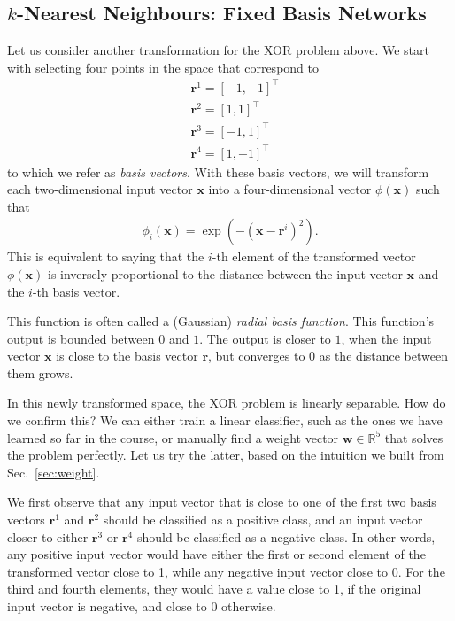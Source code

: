 \documentclass{report}
\newcommand{\vect}[1]{\mathbf{#1}}
\newcommand{\vx}[0]{\vect{x}}
\newcommand{\vw}[0]{\vect{w}}
\newcommand{\vr}[0]{\vect{r}}
\newcommand{\RR}[0]{\mathbb{R}}
\begin{document}
\subsection{$k$-Nearest Neighbours: Fixed Basis Networks}

Let us consider another transformation for the XOR problem above. We start with
selecting four points in the space that correspond to 
\begin{align*}
    &\vr^1 = [-1, -1]^\top \\
    &\vr^2 = [1, 1]^\top \\
    &\vr^3 = [-1, 1]^\top \\
    &\vr^4 = [1, -1]^\top 
\end{align*}
to which we refer as {\it basis vectors}. With these basis vectors, we will
transform each two-dimensional input vector $\vx$ into a four-dimensional vector
$\phi(\vx)$ such that
\begin{align}
    \label{eq:rbf}
    \phi_i(\vx) = \exp\left( -(\vx - \vr^i)^2 \right).
\end{align}
This is equivalent to saying that the $i$-th element of the transformed vector
$\phi(\vx)$ is inversely proportional to the distance between the input vector
$\vx$ and the $i$-th basis vector. 

This function is often called a (Gaussian) {\it radial basis function}. This
function's output is bounded between $0$ and $1$. The output is closer to $1$,
when the input vector $\vx$ is close to the basis vector $\vr$, but converges to
$0$ as the distance between them grows. 

In this newly transformed space, the XOR problem is linearly separable. How do
we confirm this? We can either train a linear classifier, such as the ones we
have learned so far in the course, or manually find a weight vector $\vw \in
\RR^5$ that solves the problem perfectly. Let us try the latter, based on the
intuition we built from Sec.~\ref{sec:weight}.

We first observe that any input vector that is close to one of the first two
basis vectors $\vr^1$ and $\vr^2$ should be classified as a positive class, and
an input vector closer to either $\vr^3$ or $\vr^4$ should be classified as a
negative class. In other words, any positive input vector would have either the
first or second element of the transformed vector close to 1, while any negative
input vector close to 0. For the third and fourth elements, they would have a
value close to 1, if the original input vector is negative, and close to 0
otherwise. 
\end{document}
